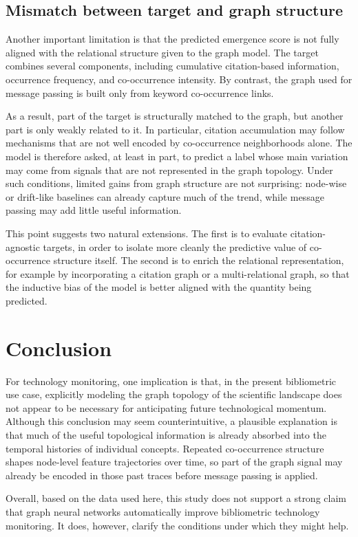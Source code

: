 \documentclass{article}
\begin{document}
\subsection{Mismatch between target and graph structure}
Another important limitation is that the predicted emergence score is not fully aligned with the relational structure given to the graph model. The target combines several components, including cumulative citation-based information, occurrence frequency, and co-occurrence intensity. By contrast, the graph used for message passing is built only from keyword co-occurrence links.

As a result, part of the target is structurally matched to the graph, but another part is only weakly related to it. In particular, citation accumulation may follow mechanisms that are not well encoded by co-occurrence neighborhoods alone. The model is therefore asked, at least in part, to predict a label whose main variation may come from signals that are not represented in the graph topology. Under such conditions, limited gains from graph structure are not surprising: node-wise or drift-like baselines can already capture much of the trend, while message passing may add little useful information.

This point suggests two natural extensions. The first is to evaluate citation-agnostic targets, in order to isolate more cleanly the predictive value of co-occurrence structure itself. The second is to enrich the relational representation, for example by incorporating a citation graph or a multi-relational graph, so that the inductive bias of the model is better aligned with the quantity being predicted.

\section{Conclusion}
For technology monitoring, one implication is that, in the present bibliometric use case, explicitly modeling the graph topology of the scientific landscape does not appear to be necessary for anticipating future technological momentum. Although this conclusion may seem counterintuitive, a plausible explanation is that much of the useful topological information is already absorbed into the temporal histories of individual concepts. Repeated co-occurrence structure shapes node-level feature trajectories over time, so part of the graph signal may already be encoded in those past traces before message passing is applied.

Overall, based on the data used here, this study does not support a strong claim that graph neural networks automatically improve bibliometric technology monitoring. It does, however, clarify the conditions under which they might help.
\end{document}
